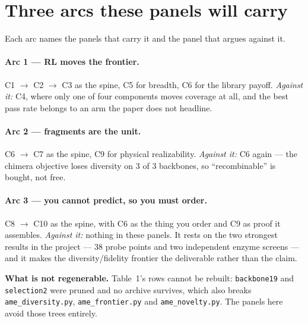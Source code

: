 \documentclass[11pt]{article}
\begin{document}
\clearpage
\section{Three arcs these panels will carry}

Each arc names the panels that carry it and the panel that argues against it.

\paragraph{Arc 1 --- RL moves the frontier.}
C1 $\to$ C2 $\to$ C3 as the spine, C5 for breadth, C6 for the library payoff.
\emph{Against it:} C4, where only one of four components moves coverage at all,
and the best pass rate belongs to an arm the paper does not headline.

\paragraph{Arc 2 --- fragments are the unit.}
C6 $\to$ C7 as the spine, C9 for physical realizability. \emph{Against it:} C6
again --- the chimera objective loses diversity on 3 of 3 backbones, so
``recombinable'' is bought, not free.

\paragraph{Arc 3 --- you cannot predict, so you must order.}
C8 $\to$ C10 as the spine, with C6 as the thing you order and C9 as proof it
assembles. \emph{Against it:} nothing in these panels. It rests on the two
strongest results in the project --- 38 probe points and two independent enzyme
screens --- and it makes the diversity/fidelity frontier the deliverable rather
than the claim.

\vspace{1em}
\noindent\textbf{What is not regenerable.} Table~1's \cleo{} rows cannot be
rebuilt: \texttt{backbone19} and \texttt{selection2} were pruned and no archive
survives, which also breaks \texttt{ame\_diversity.py},
\texttt{ame\_frontier.py} and \texttt{ame\_novelty.py}. The panels here avoid
those trees entirely.
\end{document}
